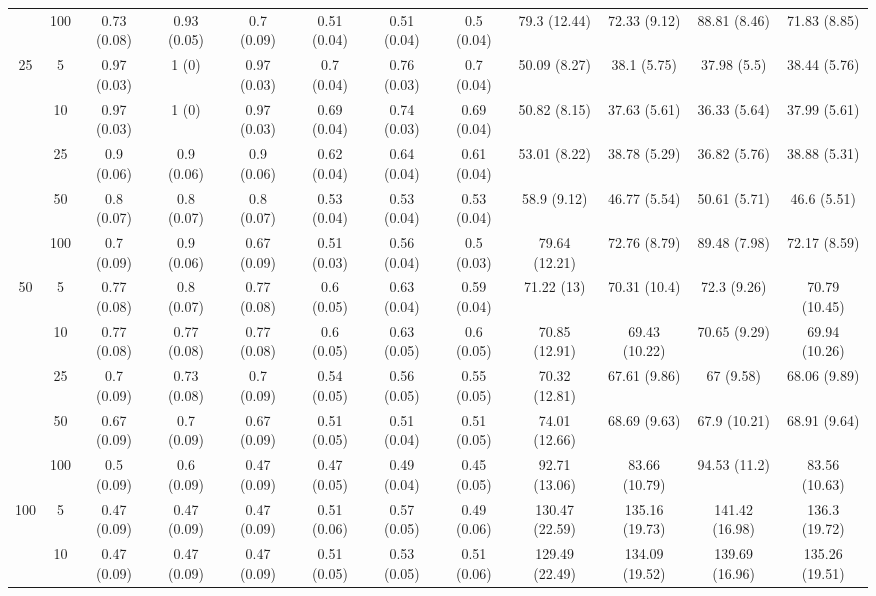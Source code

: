 \documentclass[10pt]{article}
\theoremstyle{definition}
\begin{document}
\begin{table}[H]
\begin{center}
{\begin{tabular}{cc|ccc|ccc|cccc|}
    & 100  & 0.73 (0.08) & 0.93 (0.05) & 0.7 (0.09) & 0.51 (0.04) & 0.51 (0.04) & 0.5 (0.04) & 79.3 (12.44) & 72.33 (9.12) & 88.81 (8.46) & 71.83 (8.85) \\[.3cm] 
   \multirow{5}{*}{25} & 5  & 0.97 (0.03) & 1 (0) & 0.97 (0.03) & 0.7 (0.04) & 0.76 (0.03) & 0.7 (0.04) & 50.09 (8.27) & 38.1 (5.75) & 37.98 (5.5) & 38.44 (5.76) \\ 
    & 10  & 0.97 (0.03) & 1 (0) & 0.97 (0.03) & 0.69 (0.04) & 0.74 (0.03) & 0.69 (0.04) & 50.82 (8.15) & 37.63 (5.61) & 36.33 (5.64) & 37.99 (5.61) \\ 
    & 25  & 0.9 (0.06) & 0.9 (0.06) & 0.9 (0.06) & 0.62 (0.04) & 0.64 (0.04) & 0.61 (0.04) & 53.01 (8.22) & 38.78 (5.29) & 36.82 (5.76) & 38.88 (5.31) \\ 
    & 50  & 0.8 (0.07) & 0.8 (0.07) & 0.8 (0.07) & 0.53 (0.04) & 0.53 (0.04) & 0.53 (0.04) & 58.9 (9.12) & 46.77 (5.54) & 50.61 (5.71) & 46.6 (5.51) \\ 
    & 100  & 0.7 (0.09) & 0.9 (0.06) & 0.67 (0.09) & 0.51 (0.03) & 0.56 (0.04) & 0.5 (0.03) & 79.64 (12.21) & 72.76 (8.79) & 89.48 (7.98) & 72.17 (8.59) \\[.3cm] 
   \multirow{5}{*}{50} & 5  & 0.77 (0.08) & 0.8 (0.07) & 0.77 (0.08) & 0.6 (0.05) & 0.63 (0.04) & 0.59 (0.04) & 71.22 (13) & 70.31 (10.4) & 72.3 (9.26) & 70.79 (10.45) \\ 
    & 10  & 0.77 (0.08) & 0.77 (0.08) & 0.77 (0.08) & 0.6 (0.05) & 0.63 (0.05) & 0.6 (0.05) & 70.85 (12.91) & 69.43 (10.22) & 70.65 (9.29) & 69.94 (10.26) \\ 
    & 25  & 0.7 (0.09) & 0.73 (0.08) & 0.7 (0.09) & 0.54 (0.05) & 0.56 (0.05) & 0.55 (0.05) & 70.32 (12.81) & 67.61 (9.86) & 67 (9.58) & 68.06 (9.89) \\ 
    & 50  & 0.67 (0.09) & 0.7 (0.09) & 0.67 (0.09) & 0.51 (0.05) & 0.51 (0.04) & 0.51 (0.05) & 74.01 (12.66) & 68.69 (9.63) & 67.9 (10.21) & 68.91 (9.64) \\ 
    & 100  & 0.5 (0.09) & 0.6 (0.09) & 0.47 (0.09) & 0.47 (0.05) & 0.49 (0.04) & 0.45 (0.05) & 92.71 (13.06) & 83.66 (10.79) & 94.53 (11.2) & 83.56 (10.63)\\[.3cm] 
   \multirow{5}{*}{100} & 5  & 0.47 (0.09) & 0.47 (0.09) & 0.47 (0.09) & 0.51 (0.06) & 0.57 (0.05) & 0.49 (0.06) & 130.47 (22.59) & 135.16 (19.73) & 141.42 (16.98) & 136.3 (19.72) \\ 
    & 10  & 0.47 (0.09) & 0.47 (0.09) & 0.47 (0.09) & 0.51 (0.05) & 0.53 (0.05) & 0.51 (0.06) & 129.49 (22.49) & 134.09 (19.52) & 139.69 (16.96) & 135.26 (19.51) \\ 

\end{tabular}}
\end{center}
\end{table}
\end{document}
